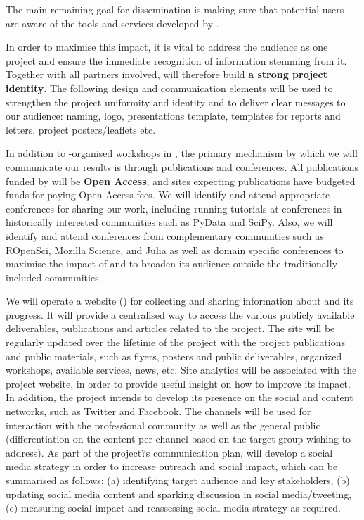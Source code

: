 The main remaining goal for dissemination is making sure that potential users 
are aware of the tools and services developed by \TheProject.

In order to maximise this impact, it is vital to address the audience as one project 
and ensure the immediate recognition of information stemming from it.
Together with all partners involved, \TheProject will therefore build \textbf{a strong project identity}. 
The following design and communication elements will be used to strengthen the project 
uniformity and identity and to deliver clear messages to our audience: \TheProject naming, logo, 
presentations template, templates for reports and letters, project posters/leaflets etc.

In addition to \TheProject-organised workshops in ,
the primary mechanism by which we will communicate our results is through publications and conferences.
All publications funded by \TheProject will be \textbf{Open Access},
and sites expecting publications have budgeted funds for paying Open Access fees.
We will identify and attend appropriate conferences for sharing our work,
including running tutorials at conferences in historically interested communities such as PyData and SciPy.
Also, we will identify and attend conferences from complementary communities such as ROpenSci, 
Mozilla Science, and Julia
as well as domain specific conferences to maximise the impact of \TheProject and to broaden its 
audience outside the
traditionally included communities.

We will operate a website ()
for collecting and sharing information about \TheProject and its progress.
It will provide a centralised way to access the various publicly available deliverables, publications 
and articles related
to the project. The site will be regularly updated over the lifetime of the project 
with the project publications and public materials, such as flyers, posters and
public deliverables, organized workshops, available services, news, etc.
Site analytics will be associated with the project website, in order
to provide useful insight on how to improve its impact. In addition, the project intends to 
develop its presence on the social and content
networks, such as Twitter and Facebook. The channels will be used for interaction 
with the professional community as well as the general public 
(differentiation on the content per channel based on the target group wishing to address). 
As part of the project?s communication plan, \TheProject will develop a social media strategy 
in order to increase outreach and social impact, which can be summarised as follows: (a) identifying target
audience and key stakeholders, (b) updating social media content and sparking 
discussion in social media/tweeting, (c) measuring social impact and reassessing 
social media strategy as required.
